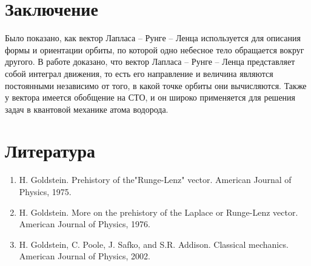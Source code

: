 \documentclass[a4paper,12pt]{article}
\begin{document}
\section*{Заключение}
Было показано, как вектор Лапласа -- Рунге -- Ленца используется для описания формы и ориентации орбиты, по которой одно небесное тело обращается вокруг другого. В работе доказано, что вектор Лапласа -- Рунге -- Ленца представляет собой интеграл движения, то есть его направление и величина являются постоянными независимо от того, в какой точке орбиты они вычисляются.
Также у вектора имеется обобщение на СТО, и он широко применяется для решения задач в квантовой механике атома водорода.


\section*{Литература}
\begin{enumerate}
\item H. Goldstein. Prehistory of the"Runge-Lenz" vector. American Journal of Physics, 1975.
\item H. Goldstein. More on the prehistory of the Laplace or Runge-Lenz vector. American Journal of Physics, 1976.
\item H. Goldstein, C. Poole, J. Safko, and S.R. Addison. Classical mechanics. American Journal of Physics, 2002.
\end{enumerate}
    
\end{document}

